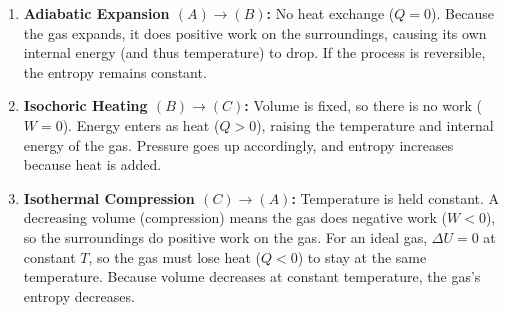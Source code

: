 \documentclass[12pt]{article}
\theoremstyle{definition} %
\theoremstyle{plain} %
\begin{document}
\begin{enumerate}
\item \textbf{Adiabatic Expansion $(A)\to(B)$:} No heat exchange ($Q=0$). Because the gas expands, it does positive work on the surroundings, causing its own internal energy (and thus temperature) to drop. 
If the process is reversible, the entropy remains constant.

\item \textbf{Isochoric Heating $(B)\to(C)$:} Volume is fixed, so there is no work ($W=0$). 
Energy enters as heat ($Q>0$), raising the temperature and internal energy of the gas. 
Pressure goes up accordingly, and entropy increases because heat is added.

\item \textbf{Isothermal Compression $(C)\to(A)$:} Temperature is held constant. 
A decreasing volume (compression) means the gas does negative work ($W<0$), so the surroundings do positive work on the gas. 
For an ideal gas, $\Delta U=0$ at constant $T$, so the gas must lose heat ($Q<0$) to stay at the same temperature. 
Because volume decreases at constant temperature, the gas's entropy decreases.
\end{enumerate}
\end{document}
